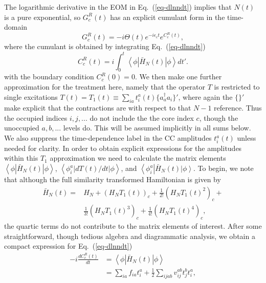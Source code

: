 \documentclass[aps,prb,twocolumn,groupaddress,floatfix]{revtex4}
\begin{document}
The logarithmic derivative in the EOM in Eq.\ (\ref{eq-dlnndt}) implies that $N(t)$ is a pure exponential, so $G_c^R(t)$ has an explicit cumulant form in the time-domain
\begin{equation}
\label{eqn:cum_form}
G_{c}^{R}(t) = -i \Theta(t) e^{-i\epsilon_c t} e^{C_c^{R}(t)},
\end{equation}
where the cumulant is obtained by integrating Eq.\ (\ref{eq-dlnndt})
\begin{equation}
\label{eqn:cum_t_f}
C_c^{R}(t) = i \int_0^t \left< \phi \left| \bar{H}_N(t) \right| \phi\right> dt'.
\end{equation}
with the boundary condition $C_c^R(0)=0$.
We then make one further approximation for the treatment here,
namely that the operator $T$ is restricted to
single excitations $T(t) = T_1(t) \equiv
\sum_{ia} t_i^a(t) \{a_a^\dagger a_i \}'$, where again the $\{\}'$ make
explicit that the contractions are with respect to that $N-1$ reference.
Thus the occupied indices $i, j, ...$ do not include the the core index $c$, though the unoccupied $a, b, ...$ levels do. This will be assumed implicitly in all sums below. We also suppress the time-dependence label in the CC amplitudes $t_i^a(t)$ unless needed for clarity. In order to obtain explicit expressions for the amplitudes within this $T_1$ approximation we need to calculate the matrix elements $\left< \phi \left| \bar{H}_N(t) \right| \phi \right>$,
$\left< \phi_{i}^{a} \left| {d T(t)}/{dt} \right| \phi \right>$,
and $\left< \phi_{i}^{a} \right| \bar{H}_N(t) \left| \phi \right>$.
To begin, we note that although the full similarity transformed Hamiltonian
is given by
\begin{equation}
\begin{split}
\bar{H}_N(t) =& H_N + \left(H_N T_1(t)\right)_c +
\frac{1}{2!} \left(H_N T_1(t)^2\right)_c + \\
&\frac{1}{3!} \left(H_N T_1(t)^3\right)_c +
\frac{1}{4!} \left(H_N T_1(t)^4\right)_c,
\end{split}
\end{equation}
the quartic terms do not contribute to the matrix elements of
interest. After some straightforward, though tedious algebra and diagrammatic
analysis, we obtain a compact expression for Eq.\ (\ref{eq-dlnndt})
\begin{equation}
\label{eqn:matel1}
\begin{split}
-i\frac{d C_c^R(t)}{dt} &= \left< \phi \left| \bar{H}_N(t) \right| \phi \right> \\
&= \sum_{ia} f_{ia} t_i^a +
\frac{1}{2} \sum_{ijab} v_{ij}^{ab} t_j^b t_i^a,
\end{split}
\end{equation}
\end{document}
